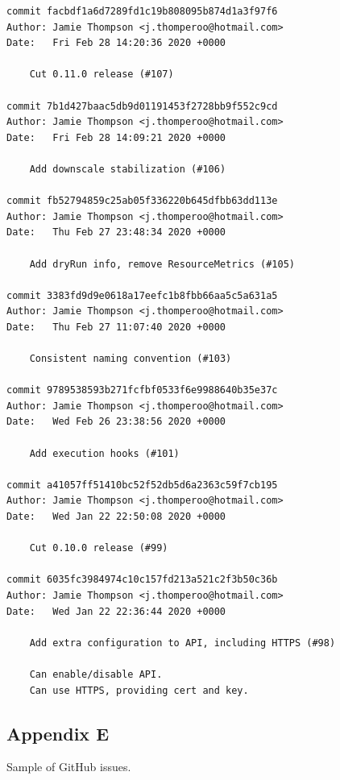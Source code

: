 \begin{lstlisting}
commit facbdf1a6d7289fd1c19b808095b874d1a3f97f6
Author: Jamie Thompson <j.thomperoo@hotmail.com>
Date:   Fri Feb 28 14:20:36 2020 +0000

    Cut 0.11.0 release (#107)

commit 7b1d427baac5db9d01191453f2728bb9f552c9cd
Author: Jamie Thompson <j.thomperoo@hotmail.com>
Date:   Fri Feb 28 14:09:21 2020 +0000

    Add downscale stabilization (#106)

commit fb52794859c25ab05f336220b645dfbb63dd113e
Author: Jamie Thompson <j.thomperoo@hotmail.com>
Date:   Thu Feb 27 23:48:34 2020 +0000

    Add dryRun info, remove ResourceMetrics (#105)

commit 3383fd9d9e0618a17eefc1b8fbb66aa5c5a631a5
Author: Jamie Thompson <j.thomperoo@hotmail.com>
Date:   Thu Feb 27 11:07:40 2020 +0000

    Consistent naming convention (#103)

commit 9789538593b271fcfbf0533f6e9988640b35e37c
Author: Jamie Thompson <j.thomperoo@hotmail.com>
Date:   Wed Feb 26 23:38:56 2020 +0000

    Add execution hooks (#101)

commit a41057ff51410bc52f52db5d6a2363c59f7cb195
Author: Jamie Thompson <j.thomperoo@hotmail.com>
Date:   Wed Jan 22 22:50:08 2020 +0000

    Cut 0.10.0 release (#99)

commit 6035fc3984974c10c157fd213a521c2f3b50c36b
Author: Jamie Thompson <j.thomperoo@hotmail.com>
Date:   Wed Jan 22 22:36:44 2020 +0000

    Add extra configuration to API, including HTTPS (#98)
    
    Can enable/disable API.
    Can use HTTPS, providing cert and key.
\end{lstlisting}
\newpage

\subsection{Appendix E}

Sample of GitHub issues.

